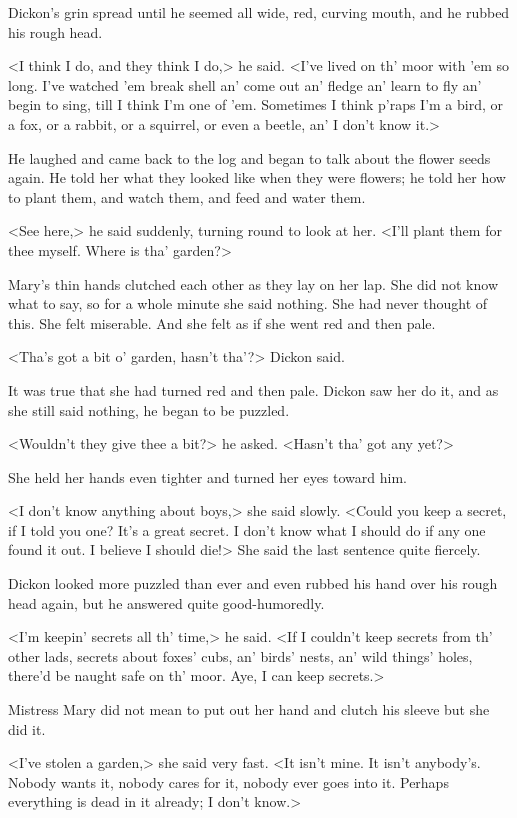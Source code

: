 Dickon's grin spread until he seemed all wide, red, curving mouth, and he rubbed his rough head.

<I think I do, and they think I do,> he said. <I've lived on th' moor with 'em so long. I've watched 'em break shell an' come out an' fledge an' learn to fly an' begin to sing, till I think I'm one of 'em. Sometimes I think p'raps I'm a bird, or a fox, or a rabbit, or a squirrel, or even a beetle, an' I don't know it.>

He laughed and came back to the log and began to talk about the flower seeds again. He told her what they looked like when they were flowers; he told her how to plant them, and watch them, and feed and water them.

<See here,> he said suddenly, turning round to look at her. <I'll plant them for thee myself. Where is tha' garden?>

Mary's thin hands clutched each other as they lay on her lap. She did not know what to say, so for a whole minute she said nothing. She had never thought of this. She felt miserable. And she felt as if she went red and then pale.

<Tha's got a bit o' garden, hasn't tha'?> Dickon said.

It was true that she had turned red and then pale. Dickon saw her do it, and as she still said nothing, he began to be puzzled.

<Wouldn't they give thee a bit?> he asked. <Hasn't tha' got any yet?>

She held her hands even tighter and turned her eyes toward him.

<I don't know anything about boys,> she said slowly. <Could you keep a secret, if I told you one? It's a great secret. I don't know what I should do if any one found it out. I believe I should die!> She said the last sentence quite fiercely.

Dickon looked more puzzled than ever and even rubbed his hand over his rough head again, but he answered quite good-humoredly.

<I'm keepin' secrets all th' time,> he said. <If I couldn't keep secrets from th' other lads, secrets about foxes' cubs, an' birds' nests, an' wild things' holes, there'd be naught safe on th' moor. Aye, I can keep secrets.>

Mistress Mary did not mean to put out her hand and clutch his sleeve but she did it.

<I've stolen a garden,> she said very fast. <It isn't mine. It isn't anybody's. Nobody wants it, nobody cares for it, nobody ever goes into it. Perhaps everything is dead in it already; I don't know.>

